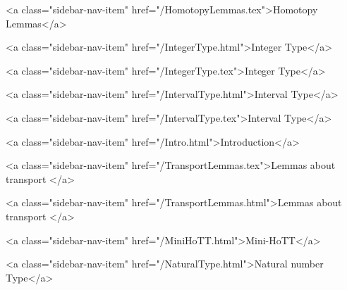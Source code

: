       
    
      
        
          <a class="sidebar-nav-item" href="/HomotopyLemmas.tex">Homotopy Lemmas</a>
        
      
    
      
        
          <a class="sidebar-nav-item" href="/IntegerType.html">Integer Type</a>
        
      
    
      
        
          <a class="sidebar-nav-item" href="/IntegerType.tex">Integer Type</a>
        
      
    
      
        
          <a class="sidebar-nav-item" href="/IntervalType.html">Interval Type</a>
        
      
    
      
        
          <a class="sidebar-nav-item" href="/IntervalType.tex">Interval Type</a>
        
      
    
      
        
          <a class="sidebar-nav-item" href="/Intro.html">Introduction</a>
        
      
    
      
        
          <a class="sidebar-nav-item" href="/TransportLemmas.tex">Lemmas about transport </a>
        
      
    
      
        
          <a class="sidebar-nav-item" href="/TransportLemmas.html">Lemmas about transport </a>
        
      
    
      
        
      
    
      
        
          <a class="sidebar-nav-item" href="/MiniHoTT.html">Mini-HoTT</a>
        
      
    
      
        
          <a class="sidebar-nav-item" href="/NaturalType.html">Natural number Type</a>
        
      
    
      
        
